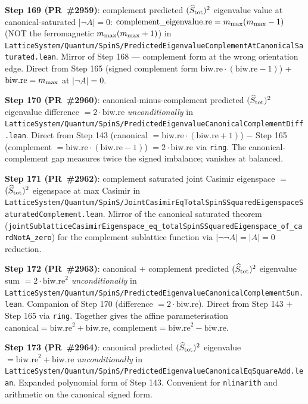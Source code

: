 \documentclass[a4paper,11pt]{article}
\begin{document}
\textbf{Step 169 (PR~\#2959)}: complement predicted $(\widehat S_{\rm tot})^2$
eigenvalue value at canonical-saturated $|\neg A| = 0$:
$\mathrm{complement\_eigenvalue.re} = m_{\rm max}(m_{\rm max} - 1)$
(NOT the ferromagnetic $m_{\rm max}(m_{\rm max} + 1)$) in
\texttt{LatticeSystem/Quantum/SpinS/PredictedEigenvalueComplementAtCanonicalSaturated.lean}.
Mirror of Step 168 — complement form at the wrong orientation edge.
Direct from Step 165 (signed complement form
$\mathrm{biw.re}\cdot(\mathrm{biw.re}-1)$) + $\mathrm{biw.re} = m_{\rm max}$
at $|\neg A| = 0$.

\textbf{Step 170 (PR~\#2960)}: canonical-minus-complement predicted
$(\widehat S_{\rm tot})^2$ eigenvalue difference $= 2 \cdot \mathrm{biw.re}$
\emph{unconditionally} in
\texttt{LatticeSystem/Quantum/SpinS/PredictedEigenvalueCanonicalComplementDiff.lean}.
Direct from Step 143 (canonical $= \mathrm{biw.re}\cdot(\mathrm{biw.re}+1)$)
$-$ Step 165 (complement $= \mathrm{biw.re}\cdot(\mathrm{biw.re}-1)$)
$= 2\cdot\mathrm{biw.re}$ via \texttt{ring}. The canonical-complement
gap measures twice the signed imbalance; vanishes at balanced.

\textbf{Step 171 (PR~\#2962)}: complement saturated joint Casimir
eigenspace $=$ $(\widehat S_{\rm tot})^2$ eigenspace at max Casimir
in
\texttt{LatticeSystem/Quantum/SpinS/JointCasimirEqTotalSpinSSquaredEigenspaceSaturatedComplement.lean}.
Mirror of the canonical saturated theorem
(\texttt{jointSublatticeCasimirEigenspace\_eq\_totalSpinSSquaredEigenspace\_of\_cardNotA\_zero})
for the complement sublattice function via $|\neg\neg A| = |A| = 0$
reduction.

\textbf{Step 172 (PR~\#2963)}: canonical $+$ complement predicted
$(\widehat S_{\rm tot})^2$ eigenvalue sum $= 2 \cdot \mathrm{biw.re}^2$
\emph{unconditionally} in
\texttt{LatticeSystem/Quantum/SpinS/PredictedEigenvalueCanonicalComplementSum.lean}.
Companion of Step 170 (difference $= 2 \cdot \mathrm{biw.re}$).
Direct from Step 143 $+$ Step 165 via \texttt{ring}. Together gives the
affine parameterisation $\mathrm{canonical} = \mathrm{biw.re}^2 + \mathrm{biw.re}$,
$\mathrm{complement} = \mathrm{biw.re}^2 - \mathrm{biw.re}$.

\textbf{Step 173 (PR~\#2964)}: canonical predicted $(\widehat S_{\rm tot})^2$
eigenvalue $= \mathrm{biw.re}^2 + \mathrm{biw.re}$ \emph{unconditionally}
in
\texttt{LatticeSystem/Quantum/SpinS/PredictedEigenvalueCanonicalEqSquareAdd.lean}.
Expanded polynomial form of Step 143. Convenient for \texttt{nlinarith}
and arithmetic on the canonical signed form.
\end{document}
